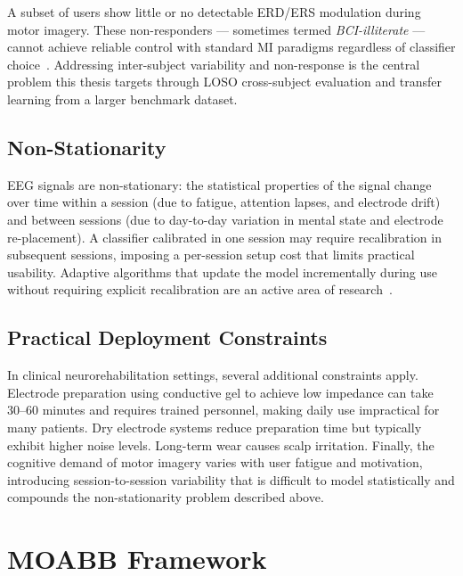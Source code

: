 \documentclass[english, bc, kiv, he, iso690alph, pdf]{fasthesis}
\begin{document}
A subset of users show little or no detectable ERD/ERS modulation during motor imagery. These non-responders — sometimes termed \textit{BCI-illiterate} — cannot achieve reliable control with standard MI paradigms regardless of classifier choice~\cite{lee2019openbmi}. Addressing inter-subject variability and non-response is the central problem this thesis targets through LOSO cross-subject evaluation and transfer learning from a larger benchmark dataset.

\subsection{Non-Stationarity}

EEG signals are non-stationary: the statistical properties of the signal change over time within a session (due to fatigue, attention lapses, and electrode drift) and between sessions (due to day-to-day variation in mental state and electrode re-placement). A classifier calibrated in one session may require recalibration in subsequent sessions, imposing a per-session setup cost that limits practical usability. Adaptive algorithms that update the model incrementally during use without requiring explicit recalibration are an active area of research~\cite{lotte2018review}.

\subsection{Practical Deployment Constraints}

In clinical neurorehabilitation settings, several additional constraints apply. Electrode preparation using conductive gel to achieve low impedance can take 30--60 minutes and requires trained personnel, making daily use impractical for many patients. Dry electrode systems reduce preparation time but typically exhibit higher noise levels. Long-term wear causes scalp irritation. Finally, the cognitive demand of motor imagery varies with user fatigue and motivation, introducing session-to-session variability that is difficult to model statistically and compounds the non-stationarity problem described above.

\section{MOABB Framework}
\end{document}
